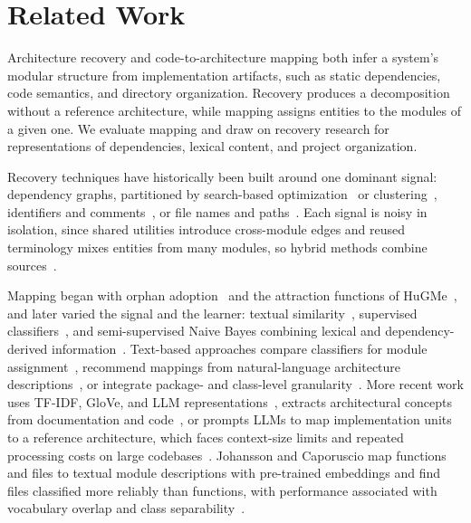 \section{Related Work\label{sec:work}}

Architecture recovery and code-to-architecture mapping both infer a system's modular structure from implementation artifacts, such as static dependencies, code semantics, and directory organization. Recovery produces a decomposition without a reference architecture, while mapping assigns entities to the modules of a given one. We evaluate mapping and draw on recovery research for representations of dependencies, lexical content, and project organization.

Recovery techniques have historically been built around one dominant signal: dependency graphs, partitioned by search-based optimization~\cite{bunch,bunch_sahc_nahc,dagc,wca,mca_eca} or clustering~\cite{cct,hcc_2019,limbo,fca,neighborhood_tree_2019,gma_2021}, identifiers and comments~\cite{arc,zbr,risi2012fold,kargar2017semantic}, or file names and paths~\cite{file_clustering}. Each signal is noisy in isolation, since shared utilities introduce cross-module edges and reused terminology mixes entities from many modules, so hybrid methods combine sources~\cite{sc_misra,escrc,nsga3,sadat2019multi,ensemble_recovery,evol,sade,sarif}.

Mapping began with orphan adoption~\cite{tzerpos1997orphan} and the attraction functions of HuGMe~\cite{christl2005equipping,christl2007automated}, and later varied the signal and the learner: textual similarity~\cite{bittencourt_IR}, supervised classifiers~\cite{bibi2016supervised}, and semi-supervised Naive Bayes combining lexical and dependency-derived information~\cite{olsson2019semi,olsson2022automatically}. Text-based approaches compare classifiers for module assignment~\cite{florean2021textclassifierscomparison}, recommend mappings from natural-language architecture descriptions~\cite{InMap}, or integrate package- and class-level granularity~\cite{sinkala2023integrated}. More recent work uses TF-IDF, GloVe, and LLM representations~\cite{johansson2024mapping}, extracts architectural concepts from documentation and code~\cite{fuchss2025enabling}, or prompts LLMs to map implementation units to a reference architecture, which faces context-size limits and repeated processing costs on large codebases~\cite{rukmono_deductive}. Johansson and Caporuscio map functions and files to textual module descriptions with pre-trained embeddings and find files classified more reliably than functions, with performance associated with vocabulary overlap and class separability~\cite{johansson2026mapping}.

